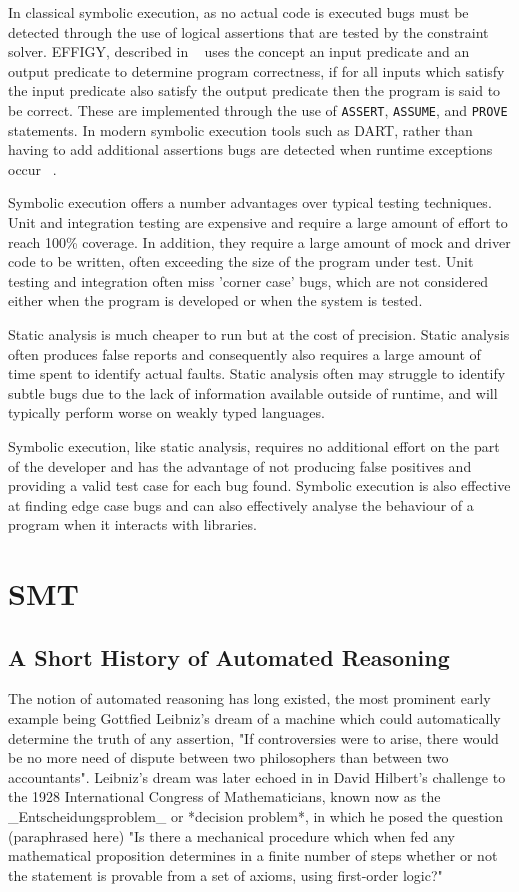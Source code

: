 \documentclass[]{final_report}
\begin{document}
In classical symbolic execution, as no actual code is executed bugs must be detected through the use of logical assertions that are tested by the constraint solver.  EFFIGY, described in ~\cite{king1976symbolic} uses the concept an input predicate and an output predicate to determine program correctness, if for all inputs which satisfy the input predicate also satisfy the output predicate then the program is said to be correct. These are implemented through the use of \lstinline{ASSERT}, \lstinline{ASSUME}, and \lstinline{PROVE} statements.  In modern symbolic execution tools such as DART, rather than having to add additional assertions bugs are detected when runtime exceptions occur ~\cite{godefroid2005dart}.

Symbolic execution offers a number advantages over typical testing techniques. Unit and integration testing are expensive and require a large amount of effort to reach 100\% coverage. In addition, they require a large amount of mock and driver code to be written, often exceeding the size of the program under test. Unit testing and integration often miss 'corner case' bugs, which are not considered either when the program is developed or when the system is tested.

Static analysis is much cheaper to run but at the cost of precision. Static analysis often produces false reports and consequently also requires a large amount of time spent to identify actual faults. Static analysis often may struggle to identify subtle bugs due to the lack of information available outside of runtime, and will typically perform worse on weakly typed languages.

Symbolic execution, like static analysis, requires no additional effort on the part of the developer and has the advantage of not producing false positives and providing a valid test case for each bug found. Symbolic execution is also effective at finding edge case bugs and can also effectively analyse the behaviour of a program when it interacts with libraries.

\chapter{SMT}

\section{A Short History of Automated Reasoning}
The notion of automated reasoning has long existed, the most prominent early example being Gottfied Leibniz's dream of a machine which could automatically determine the truth of any assertion, "If controversies were to arise, there would be no more need of dispute between two philosophers than between two accountants". Leibniz's dream was later echoed in in David Hilbert's challenge to the 1928 International Congress of Mathematicians, known now as the _Entscheidungsproblem_ or *decision problem*, in which he posed the question (paraphrased here) "Is there a mechanical procedure which when fed any mathematical proposition determines in a finite number of steps whether or not the statement is provable from a set of axioms, using first-order logic?" 
\end{document}
